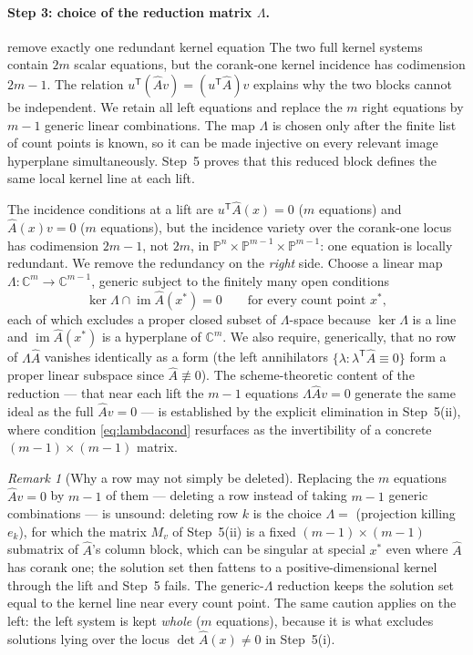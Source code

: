 \documentclass[acmsmall,screen,nonacm]{acmart}
\theoremstyle{definition}
\theoremstyle{remark}
\newtheorem{remark}{Remark}[section]
\DeclareMathOperator{\im}{im}
\newcommand{\PP}{\mathbb{P}}
\newcommand{\CC}{\mathbb{C}}
\begin{document}
\paragraph{Step 3: choice of the reduction matrix $\Lambda$.}
\begin{roadmapbox}{remove exactly one redundant kernel equation}
The two full kernel systems contain $2m$ scalar equations, but the corank-one
kernel incidence has codimension $2m-1$.  The relation
$u^{\mathsf T}(\widehat A v)=(u^{\mathsf T}\widehat A)v$ explains why the two
blocks cannot be independent.  We retain all left equations and replace the
$m$ right equations by $m-1$ generic linear combinations.  The map
$\Lambda$ is chosen only after the finite list of count points is known, so it
can be made injective on every relevant image hyperplane simultaneously.
Step~5 proves that this reduced block defines the same local kernel line at
each lift.
\end{roadmapbox}
The incidence conditions at a lift are $u^{\mathsf T}\widehat A(x)=0$
($m$ equations) and $\widehat A(x)v=0$ ($m$ equations), but the
incidence variety over the corank-one locus has codimension $2m-1$,
not $2m$, in $\PP^n\times\PP^{m-1}\times\PP^{m-1}$: one equation is
locally redundant.  We remove the redundancy on the \emph{right} side.
Choose a linear map $\Lambda:\CC^m\to\CC^{m-1}$, generic subject to
the finitely many open conditions
\begin{equation}\label{eq:lambdacond}
  \ker\Lambda\cap\im\widehat A(x^*)=0
  \qquad\text{for every count point }x^* ,
\end{equation}
each of which excludes a proper closed subset of $\Lambda$-space
because $\ker\Lambda$ is a line and $\im\widehat A(x^*)$ is a
hyperplane of $\CC^m$.  We also require, generically, that no row of
$\Lambda\widehat A$ vanishes identically as a form (the left
annihilators $\{\lambda:\lambda^{\mathsf T}\widehat A\equiv0\}$ form a
proper linear subspace since $\widehat A\not\equiv0$).  The
scheme-theoretic content of the reduction --- that near each lift the
$m-1$ equations $\Lambda\widehat Av=0$ generate the same ideal as the
full $\widehat Av=0$ --- is established by the explicit elimination in
Step~5(ii), where condition \eqref{eq:lambdacond} resurfaces as the
invertibility of a concrete $(m-1)\times(m-1)$ matrix.

\begin{remark}[Why a row may not simply be deleted]\label{rem:norow}
Replacing the $m$ equations $\widehat A v=0$ by $m-1$ of them ---
deleting a row instead of taking $m-1$ generic combinations --- is
unsound: deleting row $k$ is the choice $\Lambda=$ (projection killing
$e_k$), for which the matrix $M_v$ of Step~5(ii) is a fixed
$(m-1)\times(m-1)$ submatrix of $\widehat A$'s column block, which can
be singular at special $x^*$ even where $\widehat A$ has corank one;
the solution set then fattens to a positive-dimensional kernel through
the lift and Step~5 fails.  The generic-$\Lambda$ reduction keeps the
solution set equal to the kernel line near every count point.  The
same caution applies on the left: the left system is kept \emph{whole}
($m$ equations), because it is what excludes solutions lying over the
locus $\det\widehat A(x)\ne0$ in Step~5(i).
\end{remark}
\end{document}
